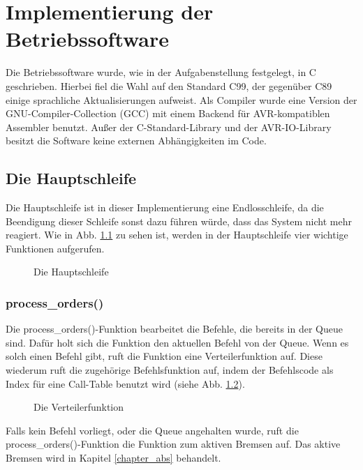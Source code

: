 \chapter{Implementierung der Betriebssoftware}
Die Betriebssoftware wurde, wie in der Aufgabenstellung festgelegt, in C geschrieben.
Hierbei fiel die Wahl auf den Standard C99, der gegenüber C89 einige sprachliche
Aktualisierungen aufweist. Als Compiler wurde eine Version der
GNU-Compiler-Collection (GCC) mit einem Backend für AVR-kompatiblen Assembler benutzt.
Außer der C-Standard-Library und der AVR-IO-Library besitzt die Software keine externen
Abhängigkeiten im Code.

\section{Die Hauptschleife}
Die Hauptschleife ist in dieser Implementierung eine Endlosschleife, da die Beendigung dieser
Schleife sonst dazu führen würde, dass das System nicht mehr reagiert.
Wie in Abb. \ref{impl_main_loop} zu sehen ist, werden in der Hauptschleife vier wichtige Funktionen
aufgerufen.
\begin{figure}[h]
 \centering
 \caption{\label{impl_main_loop}Die Hauptschleife}
\end{figure}

\subsection{process\_orders()}
Die process\_\-orders()\--Funktion bearbeitet die Befehle, die bereits in der Queue sind. Dafür holt
sich die Funktion den aktuellen Befehl von der Queue. Wenn es solch einen Befehl gibt, ruft die
Funktion eine Verteilerfunktion auf. Diese wiederum ruft die zugehörige Befehlsfunktion auf, indem
der Befehlscode als Index für eine Call-Table benutzt wird (siehe
Abb. \ref{dispatch_function}).\\
\begin{figure}[htb]
 \centering
 \caption{\label{dispatch_function}Die Verteilerfunktion}
\end{figure}
Falls kein Befehl vorliegt, oder die Queue angehalten wurde, ruft die process\_\-orders()-Funktion die
Funktion zum aktiven Bremsen auf. Das aktive Bremsen wird in Kapitel \ref{chapter_abs} behandelt.

